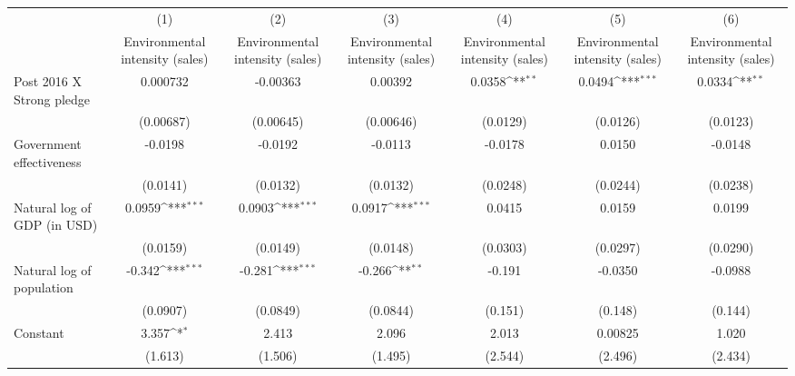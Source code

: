 {
\def\sym#1{\ifmmode^{#1}\else\(^{#1}\)\fi}
\begin{tabular}{l*{6}{c}}
\hline\hline
                    &\multicolumn{1}{c}{(1)}&\multicolumn{1}{c}{(2)}&\multicolumn{1}{c}{(3)}&\multicolumn{1}{c}{(4)}&\multicolumn{1}{c}{(5)}&\multicolumn{1}{c}{(6)}\\
                    &\multicolumn{1}{c}{Environmental intensity (sales)}&\multicolumn{1}{c}{Environmental intensity (sales)}&\multicolumn{1}{c}{Environmental intensity (sales)}&\multicolumn{1}{c}{Environmental intensity (sales)}&\multicolumn{1}{c}{Environmental intensity (sales)}&\multicolumn{1}{c}{Environmental intensity (sales)}\\
\hline
Post 2016 X Strong pledge&    0.000732         &    -0.00363         &     0.00392         &      0.0358\sym{**} &      0.0494\sym{***}&      0.0334\sym{**} \\
                    &   (0.00687)         &   (0.00645)         &   (0.00646)         &    (0.0129)         &    (0.0126)         &    (0.0123)         \\
[1em]
Government effectiveness&     -0.0198         &     -0.0192         &     -0.0113         &     -0.0178         &      0.0150         &     -0.0148         \\
                    &    (0.0141)         &    (0.0132)         &    (0.0132)         &    (0.0248)         &    (0.0244)         &    (0.0238)         \\
[1em]
Natural log of GDP (in USD)&      0.0959\sym{***}&      0.0903\sym{***}&      0.0917\sym{***}&      0.0415         &      0.0159         &      0.0199         \\
                    &    (0.0159)         &    (0.0149)         &    (0.0148)         &    (0.0303)         &    (0.0297)         &    (0.0290)         \\
[1em]
Natural log of population&      -0.342\sym{***}&      -0.281\sym{***}&      -0.266\sym{**} &      -0.191         &     -0.0350         &     -0.0988         \\
                    &    (0.0907)         &    (0.0849)         &    (0.0844)         &     (0.151)         &     (0.148)         &     (0.144)         \\
[1em]
Constant            &       3.357\sym{*}  &       2.413         &       2.096         &       2.013         &     0.00825         &       1.020         \\
                    &     (1.613)         &     (1.506)         &     (1.495)         &     (2.544)         &     (2.496)         &     (2.434)         \\

\end{tabular}}
